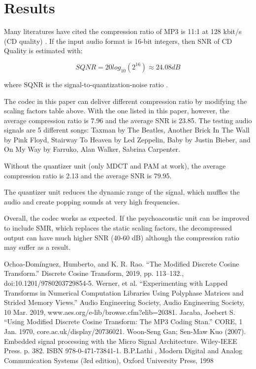 \documentclass[conference]{IEEEtran}
\begin{document}
	\section{Results}
	Many literatures have cited the compression ratio of MP3 is 11:1 at 128 kbit/s (CD quality) \cite{b4}. If the input audio format is 16-bit integers, then SNR of CD Quality is estimated with:
	
	\begin{equation}
	SQNR = 20log_{10}(2^{16}) \approx 24.08 dB
	\end{equation}
	
	where SQNR is the signal-to-quantization-noise ratio \cite{b5}. 
	
	The codec in this paper can deliver different compression ratio by modifying the scaling factors table above. With the one listed in this paper, however, the average compression ratio is 7.96 and the average SNR is 23.85. The testing audio signals are 5 different songs: Taxman by The Beatles, Another Brick In The Wall by Pink Floyd, Stairway To Heaven by Led Zeppelin, Baby by Justin Bieber, and On My Way by Farruko, Alan Walker, Sabrina Carpenter. 
	
	Without the quantizer unit (only MDCT and PAM at work), the average compression ratio is 2.13 and the average SNR is 79.95. 
	
	The quantizer unit reduces the dynamic range of the signal, which muffles the audio and create popping sounds at very high frequencies. 
	
	Overall, the codec works as expected. If the psychoacoustic unit can be improved to include SMR, which replaces the static scaling factors, the decompressed output can have much higher SNR (40-60 dB) although the compression ratio may suffer as a result.
	
	\begin{thebibliography}{00}
		 Ochoa-Domínguez, Humberto, and K. R. Rao. “The Modified Discrete Cosine Transform.” Discrete Cosine Transform, 2019, pp. 113–132., doi:10.1201/9780203729854-5.
		 Werner, et al. “Experimenting with Lapped Transforms in Numerical Computation Libraries Using Polyphase Matrices and Strided Memory Views.” Audio Engineering Society, Audio Engineering Society, 10 Mar. 2019, www.aes.org/e-lib/browse.cfm?elib=20381.
		 Jacaba, Joebert S. “Using Modified Discrete Cosine Transform: The MP3 Coding Stan.” CORE, 1 Jan. 1970, core.ac.uk/display/20736021.
		 Woon-Seng Gan; Sen-Maw Kuo (2007). Embedded signal processing with the Micro Signal Architecture. Wiley-IEEE Press. p. 382. ISBN 978-0-471-73841-1.
		 B.P.Lathi , Modern Digital and Analog Communication Systems (3rd edition), Oxford University Press, 1998
		
	\end{thebibliography}
	
\end{document}
